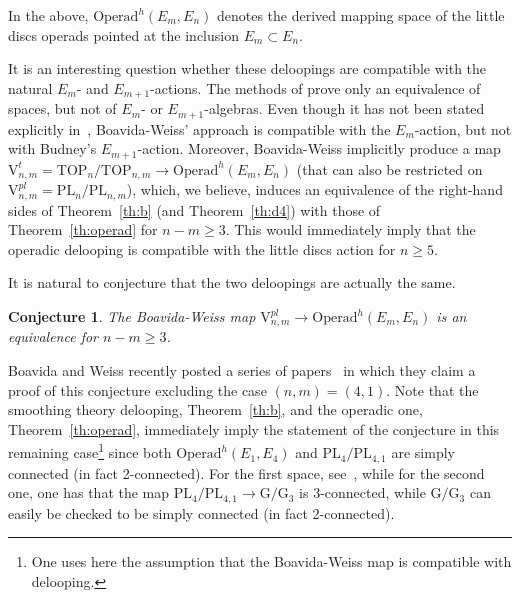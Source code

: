 \documentclass[11pt]{amsart}
\newtheorem{conjecture}[theorem]{Conjecture}
\theoremstyle{definition}
\newcommand{\Operad}{\mathrm{Operad}}
\newcommand{\PL}{\mathrm{PL}}
\newcommand{\TOP}{\mathrm{TOP}}
\newcommand{\GG}{\mathrm{G}}
\newcommand{\VV}{\mathrm{V}}
\numberwithin{equation}{section}
\begin{document}
In the above, $\Operad^h(E_m,E_n)$ denotes the derived mapping space of the little discs operads pointed at the inclusion $E_m\subset E_n$. 





It is an interesting question whether these deloopings are compatible with the natural $E_m$- and $E_{m+1}$-actions. The methods of \cite{DT,DTW} prove only an equivalence of spaces, but not of $E_m$- or $E_{m+1}$-algebras. Even though it has not been stated explicitly in~\cite{BW_conf_cat},
Boavida-Weiss' approach is compatible with the $E_m$-action, but not with Budney's $E_{m+1}$-action. Moreover, Boavida-Weiss implicitly produce a map
$\VV^{t}_{n,m}= \TOP_n/\TOP_{n,m}\to\Operad^h(E_m,E_n)$ (that can also be restricted on $\VV^{pl}_{n,m}= \PL_n/\PL_{n,m}$), which, we believe, induces an equivalence of the 
right-hand sides of Theorem~\ref{th:b} (and  Theorem~\ref{th:d4}) with those of Theorem~\ref{th:operad} for $n-m\geq 3$. This would immediately imply
that the operadic delooping is compatible with the little discs action for $n\geq 5$. 

It is natural to conjecture that the two deloopings are actually
the same.


\begin{conjecture}\label{con:pl_operad}
The Boavida-Weiss map $\VV^{pl}_{n,m} \to \Operad^h(E_m,E_n)$ is an equivalence for $n-m\geq 3$.
\end{conjecture}

Boavida and Weiss recently posted a series of papers~\cite{BW1,BW2,BW3} in which they claim a proof of this conjecture
excluding the case $(n,m)=(4,1)$.
 Note that the smoothing theory delooping, Theorem~\ref{th:b}, and the operadic one, Theorem~\ref{th:operad},  immediately 
imply 
the statement of the conjecture in this remaining case\footnote{One uses here the assumption that the Boavida-Weiss map is compatible with delooping.} since both   $ \Operad^h(E_1,E_4)$ and $\PL_4/\PL_{4,1}$ are simply connected (in fact 2-connected). For the first space, see~\cite[Proposition~10.8]{FTW}, while for the second one, one has that the map $\PL_4/\PL_{4,1}\to \GG/\GG_{3}$ is 3-connected, while $\GG/\GG_3$ can easily be checked to be simply connected (in fact 2-connected).
\end{document}

